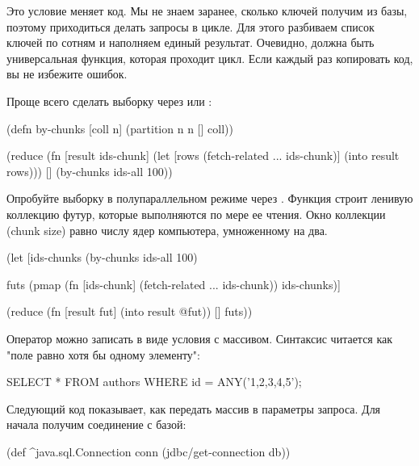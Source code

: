 Это условие меняет код. Мы не знаем заранее, сколько ключей получим из базы, поэтому приходиться делать запросы в цикле. Для этого разбиваем список ключей по сотням и наполняем единый результат. Очевидно, должна быть универсальная функция, которая проходит цикл. Если каждый раз копировать код, вы не избежите ошибок.

Проще всего сделать выборку через  или :

\begin{english}
  \begin{clojure}
(defn by-chunks [coll n]
  (partition n n [] coll))

(reduce
 (fn [result ids-chunk]
   (let [rows (fetch-related ... ids-chunk)]
     (into result rows)))
 []
 (by-chunks ids-all 100))
  \end{clojure}
\end{english}

Опробуйте выборку в полупараллельном режиме через . Функция строит ленивую коллекцию футур, которые выполняются по мере ее чтения. Окно коллекции (chunk size) равно числу ядер компьютера, умноженному на два.

\begin{english}
  \begin{clojure}
(let [ids-chunks
      (by-chunks ids-all 100)

      futs
      (pmap (fn [ids-chunk]
              (fetch-related ... ids-chunk))
            ids-chunks)]

  (reduce
   (fn [result fut]
     (into result @fut))
   []
   futs))
  \end{clojure}
\end{english}

Оператор  можно записать в виде условия  с массивом. Синтаксис читается как "поле  равно хотя бы одному элементу":

\begin{english}
  \begin{clojure}
SELECT * FROM authors WHERE id = ANY('{1,2,3,4,5}');
  \end{clojure}
\end{english}

Следующий код показывает, как передать массив в параметры запроса. Для начала получим соединение с базой:

\begin{english}
  \begin{clojure}
(def ^java.sql.Connection conn
  (jdbc/get-connection db))
  \end{clojure}
\end{english}

